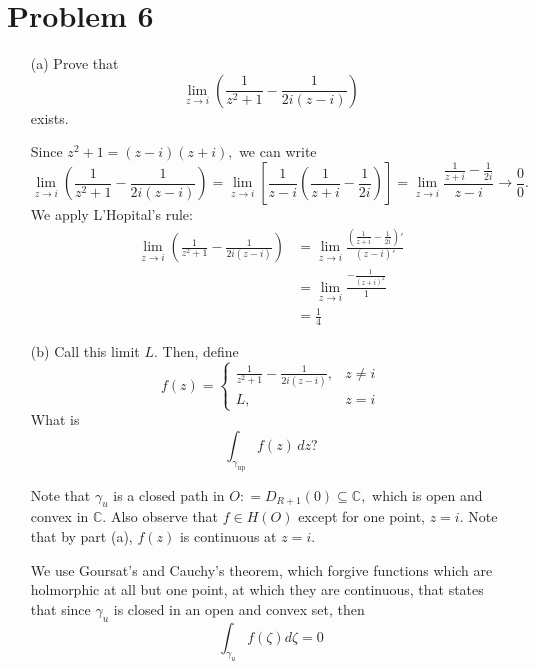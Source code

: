 \documentclass[11pt]{article}
\newcommand{\bbC}{\mathbb{C}}
\begin{document}
\newpage
\section*{Problem 6}
 \begin{enumerate}
            \item[(a)] Prove that
    \[
        \lim_{z \to i} \left( \frac{1}{z^2 + 1} - \frac{1}{2i(z - i)} \right)
    \]
    exists.
\begin{solution}
    Since $z^2 + 1 = (z -i)(z + i),$ we can write 
    \[\lim_{z \to i} \left( \frac{1}{z^2 + 1} - \frac{1}{2i(z - i)} \right) = \lim_{z\to i}\left[\frac{1}{z-i} \left( \frac{1}{z + i} - \frac{1}{2i}\right) \right] = \lim_{z\to i}\frac{\frac{1}{z + i}- \frac{1}{2i}}{z-i} \to \frac{0}{0}.\] We apply L'Hopital's rule:
    \begin{align*}
        \lim_{z \to i} \left( \frac{1}{z^2 + 1} - \frac{1}{2i(z - i)} \right) &= \lim_{z\to i}  \frac{\left(\frac{1}{z + i}- \frac{1}{2i}\right)'}{(z-i)'}\\ &= \lim_{z\to i} \frac{-\frac{1}{(z + i)^2}}{1}\\ &= \frac{1}{4}
    \end{align*}
\end{solution}

    \item[(b)] Call this limit \( L \). Then, define
    \[
    f(z) = 
    \begin{cases}
        \frac{1}{z^2 + 1} - \frac{1}{2i(z - i)}, & z \neq i \\
        L, & z = i
    \end{cases}
    \]
    What is 
    \[
    \int_{\gamma_\text{up}} f(z)\,dz?
    \]
    \begin{solution}
        Note that $\gamma_u$ is a closed path in $O: =D_{R + 1}(0) \subseteq \bbC,$ which is open and convex in $\bbC.$ Also observe that $f \in H(O)$ except for one point, $z = i.$ Note that by part (a), $f(z)$ is continuous at $z = i.$
        
        We use Goursat's and Cauchy's theorem,  which forgive functions which are holmorphic at all but one point, at which they are continuous, that states that since $\gamma_u$ is closed in an open and convex set, 
        then 
        \[\int_{\gamma_u}f(\zeta)d\zeta= 0\]
    \end{solution}


\end{enumerate}
\end{document}
